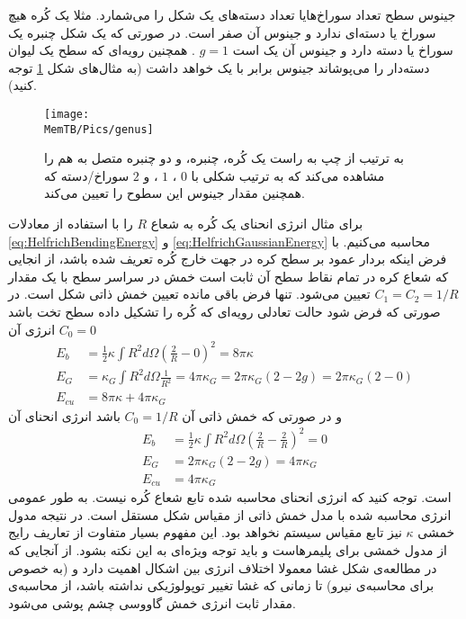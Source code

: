  جینوس سطح تعداد سوراخ‌هایا تعداد دسته‌های یک شکل را می‌شمارد.
مثلا یک کُره هیچ سوراخ یا دسته‌ای ندارد و جینوس آن صفر است. در صورتی که یک شکل چنبره
یک سوراخ یا دسته دارد و جینوس آن یک است
$g=1$
. همچنین رویه‌ای که سطح یک لیوان دسته‌دار را می‌پوشاند جینوس برابر با یک خواهد داشت (به مثال‌های شکل 
\ref{fig:genus012}
توجه کنید).
\begin{figure}[h]
\begin{center}
\texttt{[image: \\MemTB/Pics/genus]}
\caption{
به ترتیب از چپ به راست یک کُره، چنبره، و دو چنبره متصل به هم را مشاهده می‌کند که به ترتیب شکلی با 
$0$
،
$1$
، و 
$2$
سوراخ/دسته که همچنین مقدار جینوس این سطوح را تعیین می‌کند.
}
\label{fig:genus012}
\end{center}
\end{figure}
برای مثال انرژی انحنای یک کُره به شعاع
$R$
را با استفاده از معادلات
\ref{eq:HelfrichBendingEnergy}
و
\ref{eq:HelfrichGaussianEnergy}
محاسبه می‌کنیم. با فرض اینکه بردار عمود بر سطح کره در جهت خارج کُره تعریف شده باشد، از انجایی که شعاع‌ کره در تمام نقاط سطح آن ثابت است خمش در سراسر سطح با یک مقدار
$C_1=C_2=1/R$
تعیین می‌شود. تنها فرض باقی مانده تعیین خمش ذاتی شکل است. در صورتی که فرض شود حالت تعادلی رویه‌ای که کُره را تشکیل داده سطح تخت باشد
$C_0=0$
انرژی آن
 \begin{equation}
 \begin{aligned}
E_{b}&=\frac{1}{2}\kappa\int R^2d\Omega (\frac{2}{R}-0)^2=8\pi\kappa\\
E_{G}&=\kappa_G\int R^2d\Omega \frac{1}{R^2}=4\pi\kappa_G=2\pi\kappa_G(2-2g)=2\pi\kappa_G(2-0) \\
E_{cu}&=8\pi\kappa+4\pi\kappa_G
\end{aligned}
\end{equation}
و در صورتی که خمش ذاتی آن
$C_0=1/R$
باشد انرژی انحنای آن
 \begin{equation}
 \begin{aligned}
E_{b}&=\frac{1}{2}\kappa\int R^2d\Omega (\frac{2}{R}-\frac{2}{R})^2=0\\
E_{G}&=2\pi\kappa_G(2-2g)=4\pi\kappa_G \\
E_{cu}&=4\pi\kappa_G
\end{aligned}
\end{equation}
است. توجه کنید که انرژی انحنای محاسبه شده تابع شعاع کُره نیست. به طور عمومی انرژی محاسبه شده با مدل خمش ذاتی از مقیاس شکل مستقل است. در نتیجه مدول خمشی
$\kappa$
نیز تابع مقیاس سیستم نخواهد بود. این مفهوم بسیار متفاوت از تعاریف رایج از مدول خمشی برای پلیمر‌هاست و باید توجه ویژه‌ای به این نکته بشود. از آنجایی که در مطالعه‌ی شکل غشا معمولا اختلاف انرژی بین اشکال اهمیت دارد و (به خصوص برای محاسبه‌ی نیرو) تا زمانی که غشا تغییر توپولوژیکی نداشته باشد، از محاسبه‌ی مقدار ثابت انرژی خمش گاووسی چشم پوشی می‌شود. 




































